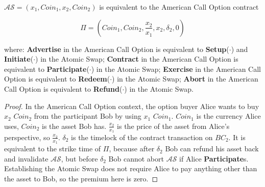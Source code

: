 \begin{theorem}
$\mathcal{AS} = (x_1, Coin_1, x_2, Coin_2)$ is equivalent to the American Call Option contract

$$
\Pi = (Coin_1, Coin_2, \frac{x_2}{x_1}, x_2, \delta_2, 0)
$$

where:
\textbf{Advertise} in the American Call Option is equivalent to \textbf{Setup}($\cdot$) and \textbf{Initiate}($\cdot$) in the Atomic Swap;
\textbf{Contract} in the American Call Option is equivalent to \textbf{Participate}($\cdot$) in the Atomic Swap;
\textbf{Exercise} in the American Call Option is equivalent to \textbf{Redeem}($\cdot$) in the Atomic Swap;
\textbf{Abort} in the American Call Option is equivalent to \textbf{Refund}($\cdot$) in the Atomic Swap.

\end{theorem}


\begin{proof}

In the American Call Option context, the option buyer Alice wants to buy $x_2$ $Coin_2$ from the participant Bob by using $x_1$ $Coin_1$.
$Coin_1$ is the currency Alice uses, $Coin_2$ is the asset Bob has.
$\frac{x_2}{x_1}$ is the price of the asset from Alice's perspective, so $\frac{x_2}{x_1}$.
$\delta_2$ is the timelock of the contract transaction on $BC_2$.
It is equivalent to the strike time of $\Pi$, because after $\delta_2$ Bob can refund his asset back and invalidate $\mathcal{AS}$, but before $\delta_2$ Bob cannot abort $\mathcal{AS}$ if Alice \textbf{Participate}s.
Establishing the Atomic Swap does not require Alice to pay anything other than the asset to Bob, so the premium here is zero.
\end{proof}
